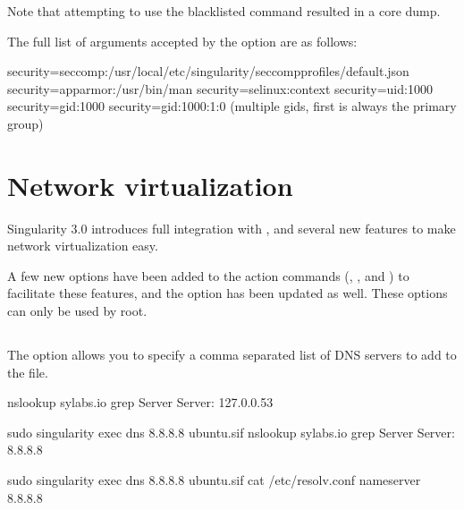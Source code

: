 \documentclass[letterpaper,10pt,english]{sphinxmanual}
\begin{document}
Note that attempting to use the blacklisted  command resulted in a
core dump.

The full list of arguments accepted by the  option are as follows:

%
\begin{sphinxVerbatim}[commandchars=\\\{\}]
\PYGZhy{}\PYGZhy{}security=\PYGZdq{}seccomp:/usr/local/etc/singularity/seccomp\PYGZhy{}profiles/default.json\PYGZdq{}
\PYGZhy{}\PYGZhy{}security=\PYGZdq{}apparmor:/usr/bin/man\PYGZdq{}
\PYGZhy{}\PYGZhy{}security=\PYGZdq{}selinux:context\PYGZdq{}
\PYGZhy{}\PYGZhy{}security=\PYGZdq{}uid:1000\PYGZdq{}
\PYGZhy{}\PYGZhy{}security=\PYGZdq{}gid:1000\PYGZdq{}
\PYGZhy{}\PYGZhy{}security=\PYGZdq{}gid:1000:1:0\PYGZdq{} (multiple gids, first is always the primary group)
\end{sphinxVerbatim}


\chapter{Network virtualization}
\label{\detokenize{networking:network-virtualization}}\label{\detokenize{networking:networking}}\label{\detokenize{networking::doc}}\label{\detokenize{networking:sec-networking}}
Singularity 3.0 introduces full integration with
 , and several new features to
make network virtualization easy.

A few new options have been added to the action commands (, ,
and ) to facilitate these features, and the  option has been
updated as well.  These options can only be used by root.


\section{}
\label{\detokenize{networking:dns}}
The  option allows you to specify a comma separated list of DNS servers
to add to the  file.

%
\begin{sphinxVerbatim}[commandchars=\\\{\}]
\PYGZdl{} nslookup sylabs.io \textbar{} grep Server
Server:             127.0.0.53

\PYGZdl{} sudo singularity exec \PYGZhy{}\PYGZhy{}dns 8.8.8.8 ubuntu.sif nslookup sylabs.io \textbar{} grep Server
Server:             8.8.8.8

\PYGZdl{} sudo singularity exec \PYGZhy{}\PYGZhy{}dns 8.8.8.8 ubuntu.sif cat /etc/resolv.conf
nameserver 8.8.8.8
\end{sphinxVerbatim}
\end{document}
